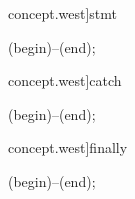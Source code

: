 \begin{syntax}[[xshift=22mm]concept.west]{stmt}
  
  \draw[path] (begin)--(end);
\end{syntax}

\begin{syntax}[[xshift=22mm]concept.west]{catch}
  
  \draw[path] (begin)--(end);
\end{syntax}

\begin{syntax}[[xshift=22mm]concept.west]{finally}
  
  \draw[path] (begin)--(end);
\end{syntax}


